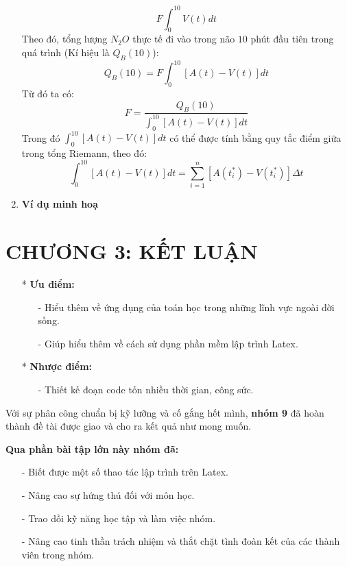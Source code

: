 \documentclass[12pt,a4paper]{article}
\begin{document}
\begin{enumerate}[a/]
\begin{flushleft}
						$$F \int_{0}^{10} V(t)dt$$
      Theo đó, tổng lượng $N_2O$ thực tế đi vào trong não $10$ phút đầu tiên trong quá trình (Kí hiệu là $Q_B(10)$):
						$$Q_B(10)=F\int_{0}^{10}\left[A(t)-V(t)\right]dt$$
						Từ đó ta có:
						$$F=\frac{Q_B(10)}{\displaystyle \int_{0}^{10}\left[A(t) - V(t)\right]dt}$$
						Trong đó $\displaystyle \int_{0}^{10}\left[A(t) - V(t)\right]dt$ có thể được tính bằng quy tắc điểm giữa trong tổng Riemann, theo đó:
						$$\displaystyle \int_{0}^{10}\left[A(t) - V(t)\right]dt = \sum_{i = 1}^{n} \left[A(t_i^*)-V(t_i^*)\right] \Delta t$$
      \end{flushleft}
            \item \textbf{Ví dụ minh hoạ}
      \end{enumerate}
\newpage
{}
\section*{CHƯƠNG 3: KẾT LUẬN}
\begin{itemize}
    \item[*] \textbf{Ưu điểm:}
    \begin{itemize}
        \item[-] Hiểu thêm về ứng dụng của toán học trong những lĩnh vực ngoài đời sống.
        \item[-] Giúp hiểu thêm về cách sử dụng phần mềm lập trình Latex.
    \end{itemize}
    \item[*] \textbf{Nhược điểm:}
    \begin{itemize}
        \item[-] Thiết kế đoạn code tốn nhiều thời gian, công sức.
    \end{itemize}
\end{itemize}

\vspace{2em}
Với sự phân công chuẩn bị kỹ lưỡng và cố gắng hết mình, \textbf{nhóm 9} đã hoàn thành đề tài được giao và cho ra kết quả như mong muốn. 

\vspace{2em}
\textbf{Qua phần bài tập lớn này nhóm đã:}
\begin{itemize}
    \item[-] Biết được một số thao tác lập trình trên Latex.
    \item[-] Nâng cao sự hứng thú đối với môn học.
    \item[-] Trao dồi kỹ năng học tập và làm việc nhóm.
    \item[-] Nâng cao tinh thần trách nhiệm và thắt chặt tình đoàn kết của các thành viên trong nhóm.
\end{itemize}
\end{document}
